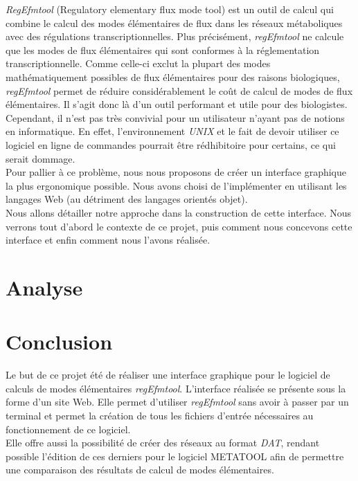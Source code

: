 \documentclass[12pt,a4paper]{report}
\begin{document}
\emph{RegEfmtool} (Regulatory elementary flux mode tool) est un outil de calcul qui combine le calcul des modes élémentaires de flux dans les réseaux métaboliques avec des régulations transcriptionnelles. Plus précisément, \emph{regEfmtool} ne calcule que les modes de flux élémentaires qui sont conformes à la réglementation transcriptionnelle. Comme celle-ci exclut la plupart des modes mathématiquement possibles de flux élémentaires pour des raisons biologiques, \emph{regEfmtool} permet de réduire considérablement le coût de calcul de modes de flux élémentaires. Il s'agit donc là d'un outil performant et utile pour des biologistes. Cependant, il n'est pas très convivial pour un utilisateur n'ayant pas de notions en informatique. En effet, l'environnement \emph{UNIX} et le fait de devoir utiliser ce logiciel en ligne de commandes pourrait être rédhibitoire pour certains, ce qui serait dommage. \\

Pour pallier à ce problème, nous nous proposons de créer un interface graphique la plus ergonomique possible. Nous avons choisi de l'implémenter en utilisant les langages Web (au détriment des langages orientés objet). \\

Nous allons détailler notre approche dans la construction de cette interface. Nous verrons tout d'abord le contexte de ce projet, puis comment nous concevons cette interface et enfin comment nous l'avons réalisée.



\chapter{Analyse}


\pagebreak

\pagebreak






\chapter*{Conclusion}
Le but de ce projet été de réaliser une interface graphique pour le logiciel de calculs de modes élémentaires \textit{regEfmtool}. L'interface réalisée se présente sous la forme d'un site Web. Elle permet d'utiliser \textit{regEfmtool} sans avoir à passer par un terminal et permet la création de tous les fichiers d'entrée nécessaires au fonctionnement de ce logiciel.\\
Elle offre aussi la possibilité de créer des réseaux au format \emph{DAT}, rendant possible l'édition de ces derniers pour le logiciel METATOOL afin de permettre une comparaison des résultats de calcul de modes élémentaires.\\
\end{document}
